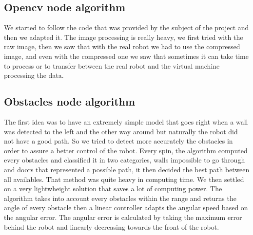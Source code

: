 \documentclass[conference]{IEEEtran}
\begin{document}
\subsection{Opencv node algorithm}
We started to follow the code that was provided by the subject of the project and then we adapted it. The image processing is really heavy, we first tried with the raw image, then we saw that with the real robot we had to use the compressed image, and even with the compressed one we saw that sometimes it can take time to process or to transfer between the real robot and the virtual machine processing the data.

\subsection{Obstacles node algorithm}
The first idea was to have an extremely simple model that goes right when a wall was detected to the left and the other way around but naturally the robot did not have a good path. So we tried to detect more accurately the obstacles in order to assure a better control of the robot. Every spin, the algorithm computed every obstacles and classified it in two categories, walls impossible to go through and doors that represented a possible path, it then decided the best path between all availables. That method was quite heavy in computing time. We then settled on a very lightwheight solution that saves a lot of computing power. The algorithm takes into account every obstacles within the range and returns the angle of every obstacle then a linear controller adapts the angular speed based on the angular error. The angular error is calculated by taking the maximum error behind the robot and linearly decreasing towards the front of the robot.
\end{document}
